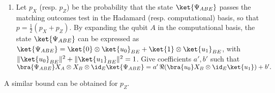 \begin{exercises}
\begin{enumerate}
\item Let $p_X$ (resp. $p_Z$) be the probability that the state $\ket{\Psi_{ABE}}$ passes the matching outcomes test in the Hadamard (resp. computational) basis, so that $p=\frac{1}{2}(p_X+p_Z)$.
By expanding the qubit $A$ in the computational basis, the state $\ket{\Psi_{ABE}}$ can be expressed as $\ket{\Psi_{ABE}} = \ket{0}\otimes\ket{u_0}_{BE} + \ket{1}\otimes\ket{u_1}_{BE}$, with $\|\ket{u_0}_{BE}\|^2+\|\ket{u_1}_{BE}\|^2=1$. Give coefficients $a',b'$ such that
$ \bra{\Psi_{ABE}} X_A \otimes X_B \otimes \id_E \ket{\Psi_{ABE}} = a'\, \Re(\bra{u_0} X_B \otimes \id_E \ket{u_1}) + b'.$
\end{enumerate}
A similar bound can be obtained for $p_Z$.


\end{exercises}
